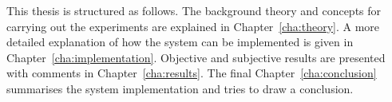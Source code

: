 This thesis is structured as follows. The background theory and concepts for carrying out the experiments are explained in Chapter~\ref{cha:theory}. A more detailed explanation of how the system can be implemented is given in Chapter~\ref{cha:implementation}. Objective and subjective results are presented with comments in Chapter~\ref{cha:results}. The final Chapter~\ref{cha:conclusion} summarises the system implementation and tries to draw a conclusion.

